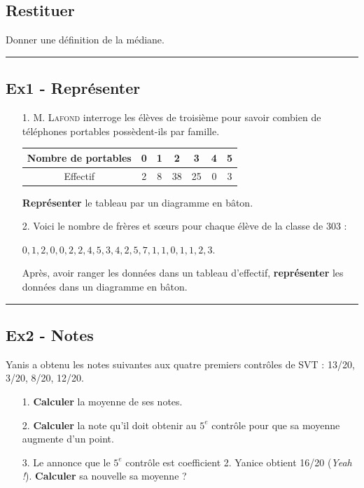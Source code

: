 \documentclass[12pt]{article}
\newcommand{\horrule}[1]{\rule{\linewidth}{#1}} %
\begin{document}
\begin{multicols}{2}

\subsection*{Restituer}

Donner une définition de la médiane. 

\horrule{1px}
\subsection*{Ex1 - Représenter}

\begin{enumerate}
\item[1.] \textsc{M. Lafond} interroge les élèves de troisième pour savoir combien de téléphones portables possèdent-ils par famille.

\begin{center}
  \begin{tabular}{|c||c|c|c|c|c|c|}
    \hline
    Nombre de portables & 0 & 1 & 2 & 3 & 4 & 5 \\
    \hline 
    Effectif & 2 & 8 & 38 & 25 & 0 & 3 \\
    \hline
  \end{tabular}
\end{center}

\textbf{Représenter} le tableau par un diagramme en bâton.

\item[2.] Voici le nombre de frères et sœurs pour chaque élève de la classe de 303 : 

$0, 1, 2, 0, 0, 2, 2, 4, 5, 3, 4, 2, 5, 7, 1, 1, 0, 1, 1, 2, 3.$

Après, avoir ranger les données dans un tableau d'effectif, \textbf{représenter} les données dans un diagramme en bâton.
\end{enumerate}

\horrule{1px}
\subsection*{Ex2 - Notes}

Yanis a obtenu les notes suivantes aux quatre premiers contrôles de SVT : 13/20, 3/20, 8/20, 12/20.

\begin{enumerate}
\item[1.] \textbf{Calculer} la moyenne de ses notes.
\item[2.] \textbf{Calculer} la note qu'il doit obtenir au $5^e$ contrôle pour que sa moyenne augmente d'un point.
\item[3.] Le annonce que le $5^e$ contrôle est coefficient 2. Yanice obtient 16/20 (\textit{Yeah !}). \textbf{Calculer} sa nouvelle sa moyenne ?
\end{enumerate}


\end{multicols}
\end{document}
